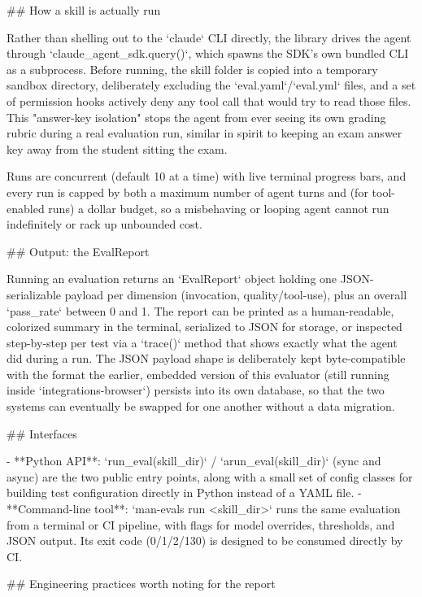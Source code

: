 ## How a skill is actually run

Rather than shelling out to the `claude` CLI directly, the library drives the agent through `claude_agent_sdk.query()`, which spawns the SDK's own bundled CLI as a subprocess.
Before running, the skill folder is copied into a temporary sandbox directory, deliberately excluding the `eval.yaml`/`eval.yml` files, and a set of permission hooks actively deny any tool call that would try to read those files.
This "answer-key isolation" stops the agent from ever seeing its own grading rubric during a real evaluation run, similar in spirit to keeping an exam answer key away from the student sitting the exam.

Runs are concurrent (default 10 at a time) with live terminal progress bars, and every run is capped by both a maximum number of agent turns and (for tool-enabled runs) a dollar budget, so a misbehaving or looping agent cannot run indefinitely or rack up unbounded cost.

## Output: the EvalReport

Running an evaluation returns an `EvalReport` object holding one JSON-serializable payload per dimension (invocation, quality/tool-use), plus an overall `pass_rate` between 0 and 1.
The report can be printed as a human-readable, colorized summary in the terminal, serialized to JSON for storage, or inspected step-by-step per test via a `trace()` method that shows exactly what the agent did during a run.
The JSON payload shape is deliberately kept byte-compatible with the format the earlier, embedded version of this evaluator (still running inside `integrations-browser`) persists into its own database, so that the two systems can eventually be swapped for one another without a data migration.

## Interfaces

- **Python API**: `run_eval(skill_dir)` / `arun_eval(skill_dir)` (sync and async) are the two public entry points, along with a small set of config classes for building test configuration directly in Python instead of a YAML file.
- **Command-line tool**: `man-evals run <skill_dir>` runs the same evaluation from a terminal or CI pipeline, with flags for model overrides, thresholds, and JSON output. Its exit code (0/1/2/130) is designed to be consumed directly by CI.

## Engineering practices worth noting for the report

